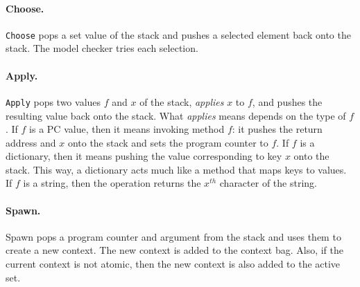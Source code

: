 \documentclass[twocolumn]{article}
\begin{document}
\paragraph{Choose.} \texttt{Choose} pops a set value of the stack
and pushes a selected element back onto the stack.  The model checker
tries each selection.

\paragraph{Apply.}  \texttt{Apply} pops two values $f$ and $x$ of the stack,
\emph{applies} $x$ to $f$, and pushes the resulting value back onto the
stack.  What \emph{applies} means depends on the type of $f$.  If $f$ is
a PC value, then it means invoking method $f$: it pushes the return address
and $x$ onto the stack and sets the program counter to $f$.  If $f$ is a
dictionary, then it means pushing the value corresponding to key $x$ onto
the stack.  This way, a dictionary acts much like a method that maps keys
to values.  If $f$ is a string, then the operation returns the $x^{th}$
character of the string.

\paragraph{Spawn.}  Spawn pops a program counter and argument from the
stack and uses them to create a new context.  The new context is added
to the context bag.  Also, if the current context is not atomic, then
the new context is also added to the active set.
\end{document}
